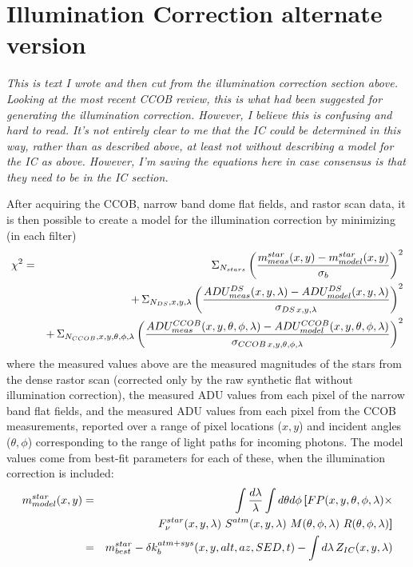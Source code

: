 \documentclass[12pt,preprint]{aastex}
\begin{document}
\section{Illumination Correction alternate version}

{\it This is text I wrote and then cut from the illumination correction section above.
Looking at the most recent CCOB review, this is what had been suggested for generating
the illumination correction. However, I believe this is confusing and hard to read. 
It's not entirely clear to me that the IC could be determined in this way, rather than
as described above, at least not without describing a model for the IC as above. However,
I'm saving the equations here in case consensus is that they need to be in the IC section.}


After acquiring the CCOB, narrow band dome flat fields, and rastor
scan data, it is then possible to create a model for the illumination
correction by minimizing (in each filter)
\begin{eqnarray}
 \chi^2 & = & \Sigma_{N_{stars}} \left( { m^{star}_{meas}(x,y) - m^{star}_{model}(x,y)
\over \sigma_b} \right)^2  \\
  & & +\, \Sigma_{N_{DS}, x,y,\lambda} \left( {
    ADU^{DS}_{meas}(x,y,\lambda) - ADU^{DS}_{ model}(x,y,\lambda) \over
    \sigma_{DS \, x,y,\lambda } } \right)^2  \nonumber  \\
 & & +\,  \Sigma_{N_{CCOB},x,y,\theta,\phi,\lambda} \left( { 
   ADU^{CCOB}_{meas}(x,y,\theta,\phi,\lambda) - ADU^{CCOB}_{model}(x,y,\theta,\phi,\lambda) \over
   \sigma_{CCOB \,x,y,\theta,\phi,\lambda}}  \right)^2   \nonumber
\end{eqnarray}
where the measured values above are the measured magnitudes of the stars
from the dense rastor scan (corrected only by the raw synthetic flat
without illumination correction), the measured ADU values from each pixel of the narrow band
flat fields, and the measured ADU values from each pixel from the CCOB
measurements, reported over a range of pixel locations ($x,y$) and incident
angles ($\theta,\phi$) corresponding to the range of light paths for
incoming photons. The model values come from best-fit parameters for each
of these, when the illumination correction is included: 
\begin{eqnarray}
m^{star}_{model}(x,y) & = &  \int {d\lambda \over \lambda} \int d\theta d\phi \, {\textbf[} FP(x,y,\theta,\phi,\lambda) \times \nonumber \\
&& F_\nu^{star}(x,y,\lambda)\,\, S^{atm}(x,y,\lambda)\, \,M(\theta,\phi,\lambda)\,\,R(\theta,\phi,\lambda) {\textbf]} \nonumber \\
 & = & m^{star}_{best} - \delta k_{b}^{atm+sys}(x,y,alt,az,SED,t) - \int d\lambda \, Z_{IC}(x,y,\lambda)
\end{eqnarray}
\end{document}
